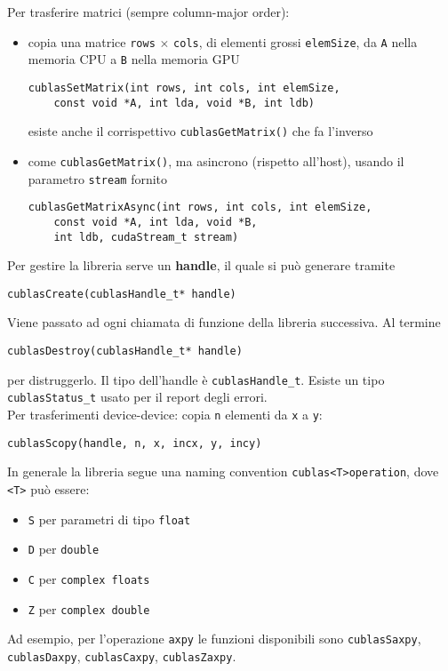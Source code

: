 Per trasferire matrici (sempre column-major order): 
\begin{itemize}
	\item copia una matrice \texttt{rows} $\times$ \texttt{cols}, di elementi grossi \texttt{elemSize}, da \texttt{A} nella memoria CPU a \texttt{B} nella memoria GPU
	\begin{verbatim}
cublasSetMatrix(int rows, int cols, int elemSize, 
	const void *A, int lda, void *B, int ldb)
	\end{verbatim}
	esiste anche il corrispettivo \texttt{cublasGetMatrix()} che fa l'inverso
	\item come \texttt{cublasGetMatrix()}, ma asincrono (rispetto all'host), usando il parametro \texttt{stream} fornito
	\begin{verbatim}
cublasGetMatrixAsync(int rows, int cols, int elemSize, 
	const void *A, int lda, void *B, 
	int ldb, cudaStream_t stream)
	\end{verbatim}
\end{itemize}

Per gestire la libreria serve un \textbf{handle}, il quale si può generare tramite
\begin{verbatim}
cublasCreate(cublasHandle_t* handle)
\end{verbatim}
Viene passato ad ogni chiamata di funzione della libreria successiva. Al termine
\begin{verbatim}
cublasDestroy(cublasHandle_t* handle)
\end{verbatim}
per distruggerlo. Il tipo dell'handle è \texttt{cublasHandle\_t}. Esiste un tipo \texttt{cublasStatus\_t} usato per il report degli errori.\\

Per trasferimenti device-device: copia \texttt{n} elementi da \texttt{x} a \texttt{y}:
\begin{verbatim}
cublasScopy(handle, n, x, incx, y, incy)
\end{verbatim}

In generale la libreria segue una naming convention \texttt{cublas<T>operation}, dove \texttt{<T>} può essere: 
\begin{itemize}
	\item \texttt{S} per parametri di tipo \texttt{float}
	\item \texttt{D} per \texttt{double}
	\item \texttt{C} per \texttt{complex  floats}
	\item \texttt{Z} per \texttt{complex double}
\end{itemize}
Ad esempio, per l'operazione \texttt{axpy} le funzioni disponibili sono \texttt{cublasSaxpy}, \texttt{cublasDaxpy}, \texttt{cublasCaxpy}, \texttt{cublasZaxpy}.\\

